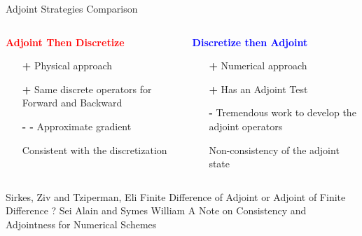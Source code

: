 
\begin{frame}{Adjoint Strategies Comparison}
  \begin{columns}
    \begin{column}[t]{0.5\textwidth}
      \textbf{\textcolor{red}{Adjoint Then Discretize}}
      \vspace{0.5cm}
      \begin{itemize}
      \item[\textcolor{\mygreen}{\textbf{+}}] Physical approach
      \item[\textcolor{\mygreen}{\textbf{+}}] Same discrete operators for Forward and Backward
      \item[\textbf{- -}] Approximate gradient \cite{Sirkes}
      \item[\textcolor{black}{\textbullet}] Consistent with the discretization
      \end{itemize}
      \vspace{0.5cm}
    \end{column}\vrule \hfill
    \begin{column}[t]{0.5\textwidth}
      \textbf{\textcolor{blue}{Discretize then Adjoint}}
      \vspace{0.5cm}
      \begin{itemize}
      \item[\textcolor{\mygreen}{\textbf{+}}] Numerical approach
      \item[\textcolor{\mygreen}{\textbf{+}}] Has an Adjoint Test
      \item[\textbf{-}] Tremendous work to develop the adjoint operators
      \item[\textcolor{black}{\textbullet}] Non-consistency of the adjoint state \cite{Set1997Feb}
      \end{itemize}
    \end{column}
  \end{columns}

  \vfill
  \tiny
  \begin{thebibliography}{2}
     Sirkes, Ziv and Tziperman, Eli
      \newblock Finite Difference of Adjoint or Adjoint of Finite Difference ?
   Sei Alain and Symes William
    \newblock A Note on Consistency and Adjointness for Numerical Schemes
  \end{thebibliography}

\end{frame}









